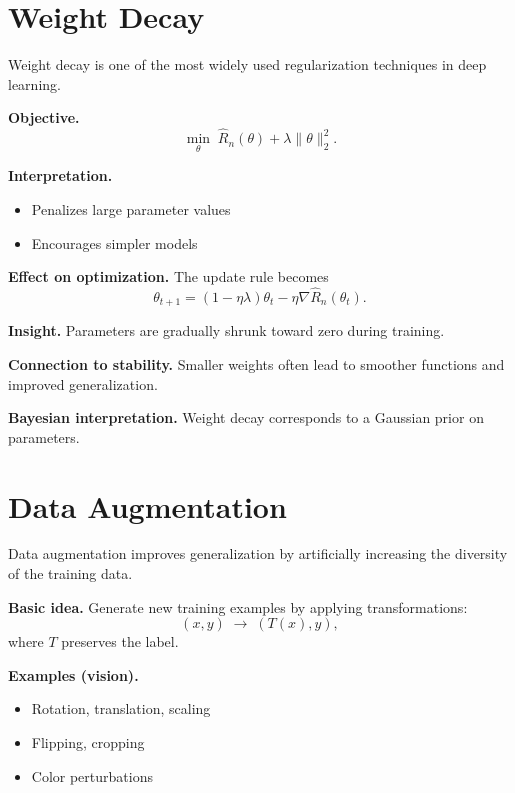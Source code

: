 \section{Weight Decay}

Weight decay is one of the most widely used regularization techniques in deep learning.

\medskip

\noindent
\textbf{Objective.}
\[
\min_\theta \; \hat{R}_n(\theta) + \lambda \|\theta\|_2^2.
\]

\medskip

\noindent
\textbf{Interpretation.}
\begin{itemize}
    \item Penalizes large parameter values
    \item Encourages simpler models
\end{itemize}

\medskip

\noindent
\textbf{Effect on optimization.}  
The update rule becomes
\[
\theta_{t+1} = (1 - \eta \lambda)\theta_t - \eta \nabla \hat{R}_n(\theta_t).
\]

\medskip

\noindent
\textbf{Insight.}  
Parameters are gradually shrunk toward zero during training.

\medskip

\noindent
\textbf{Connection to stability.}  
Smaller weights often lead to smoother functions and improved generalization.

\medskip

\noindent
\textbf{Bayesian interpretation.}  
Weight decay corresponds to a Gaussian prior on parameters.

\section{Data Augmentation}

Data augmentation improves generalization by artificially increasing the diversity of the training data.

\medskip

\noindent
\textbf{Basic idea.}  
Generate new training examples by applying transformations:
\[
(x, y) \;\rightarrow\; (T(x), y),
\]
where $T$ preserves the label.

\medskip

\noindent
\textbf{Examples (vision).}
\begin{itemize}
    \item Rotation, translation, scaling
    \item Flipping, cropping
    \item Color perturbations
\end{itemize}

